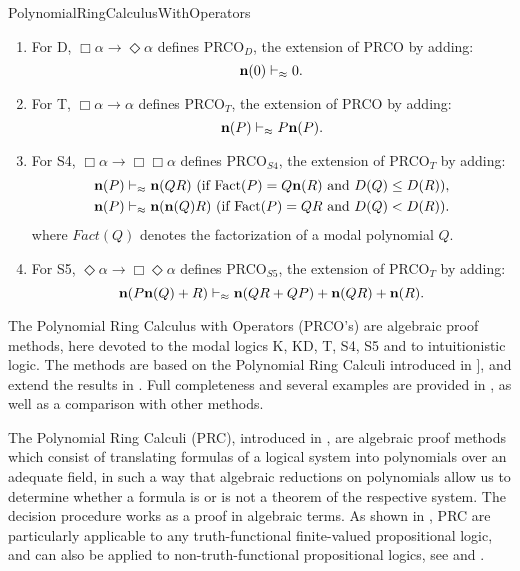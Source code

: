 \begin{entry}{PolynomialRingCalculusWithOperators}
\begin{calculus}
\begin{enumerate}
\item  For D, $\Box\alpha \to \Diamond \alpha $ defines  PRCO$_{D}$,  the extension of PRCO   by adding:
 \begin{equation*}
	 \textbf{n}(0) \vdash_{\approx} 0 . 
 \end{equation*}
\item 	For T, $\Box\alpha \to \alpha$ defines PRCO$_{T}$,  the extension of PRCO  by adding:
\begin{equation*}
	\textbf{n}(P) \vdash_{\approx} P \textbf{n}(P).
\end{equation*}
\item For S4, $\Box\alpha \to \Box\Box\alpha$  defines PRCO$_{S4}$, the extension of  PRCO$_T$   by adding:
\begin{align*}
	&\textbf{n}(P) \vdash_{\approx} \textbf{n}(QR) \mbox{ (if $\mbox{Fact}(P) = Q \textbf{n}(R)$ and $D(Q) \leq D(R)$)},   \\ 
	&\textbf{n}(P) \vdash_{\approx} \textbf{n}(\textbf{n}(Q)R) \mbox{ (if $\mbox{Fact}(P) = Q R$ and $D(Q) < D(R)$)}.  
 \end{align*} 
  where $Fact(Q)$ denotes the factorization of a modal polynomial $Q$.
	\item For  S5, $\Diamond\alpha \to \Box\Diamond\alpha$ defines  PRCO$_{S5}$, the extension of  PRCO$_T$   by adding:
\begin{equation*}
	\textbf{n}(P \textbf{n}(Q) + R) \vdash_{\approx} \textbf{n}(Q R + Q P) + \textbf{n}(Q R) + \textbf{n}(R). 
\end{equation*}
\end{enumerate}

\end{calculus}


\begin{clarifications}
The Polynomial Ring Calculus with Operators (PRCO's) are  algebraic proof methods,  
here devoted to the modal logics K, KD, T, S4, S5 and to  intuitionistic logic. The methods are
based on the Polynomial Ring Calculi introduced in  \cite{car:2005}], and extend
the results in \cite{agude-car:2011}. Full completeness and  several examples are provided in 
\cite{agude-car:2015},  as well as a comparison with other methods.    

\end{clarifications}

\begin{history}

The Polynomial Ring Calculi (PRC), introduced in \cite{car:2005}, are   algebraic proof
methods which consist of translating formulas of a logical system into polynomials 
over an adequate field, in such a way that algebraic reductions on polynomials
allow us to determine whether a formula is or is not a theorem of the respective
system. The decision procedure works as a proof in algebraic  terms. As shown in  \cite{car:2005}, 
PRC are particularly applicable to any truth-functional finite-valued propositional logic,
and can also be applied to non-truth-functional propositional logics, see
\cite{car-mat:2014} and  \cite{car-mat:2015}.


\end{history}
\end{entry}
